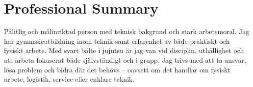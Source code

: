 \section{Professional Summary}
Pålitlig och målinriktad person med teknisk bakgrund och stark arbetsmoral. Jag har gymnasieutbildning inom teknik samt erfarenhet av både praktiskt och fysiskt arbete. Med svart bälte i jujutsu är jag van vid disciplin, uthållighet och att arbeta fokuserat både självständigt och i grupp. Jag trivs med att ta ansvar, lösa problem och bidra där det behövs – oavsett om det handlar om fysiskt arbete, logistik, service eller enklare teknik.

